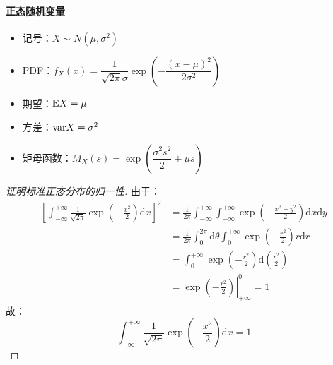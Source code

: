 
\paragraph{正态随机变量}

\begin{itemize}[itemsep=1ex]
    \item 记号：$X\sim N(\mu,\sigma^2)$
    \item PDF：$f_X(x)=\dfrac{1}{\sqrt{2\pi}\sigma}\exp\left({-\dfrac{(x-\mu)^2}{2\sigma^2}}\right)$
    \item 期望：$\mathbb{E} X=\mu$
    \item 方差：$\mathrm{var} X=\sigma^2$
    \item 矩母函数：$M_X(s)=\exp\left({\dfrac{\sigma^2s^2}{2}+\mu s}\right)$
\end{itemize}

\begin{proof}[证明标准正态分布的归一性]
由于：
\begin{align*}
\left[\int_{-\infty}^{+\infty}\frac{1}{\sqrt{2\pi}}\exp\left({-\frac{x^2}{2}}\right)\mathrm dx\right]^2&=\frac{1}{2\pi}\int_{-\infty}^{+\infty}\int_{-\infty}^{+\infty}\exp\left({-\frac{x^2+y^2}{2}}\right)\mathrm dx\mathrm dy\\
&=\frac{1}{2\pi}\int_0^{2\pi}\mathrm d\theta\int_{0}^{+\infty}\exp\left({-\frac{r^2}{2}}\right)r\mathrm dr\\
&=\int_0^{+\infty}\exp\left({-\frac{r^2}{2}}\right)\mathrm d\left(\frac{r^2}{2}\right)\\
&=\left.\exp\left({-\frac{r^2}{2}}\right)\right|_{+\infty}^0=1
\end{align*}
故：
\[
\int_{-\infty}^{+\infty}\frac{1}{\sqrt{2\pi}}\exp\left({-\frac{x^2}{2}}\right)\mathrm dx=1
\]
\end{proof}
